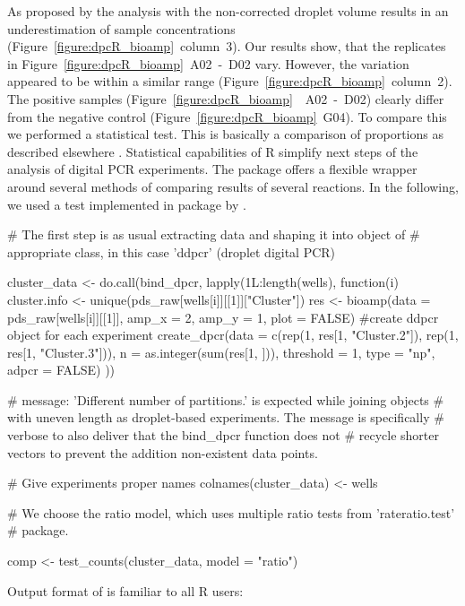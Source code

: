 As proposed by \citet{corbisier_2015} the analysis with the non-corrected 
droplet volume results in an underestimation of sample concentrations 
(Figure~\ref{figure:dpcR_bioamp}~column~3). Our results show, that the 
replicates in Figure~\ref{figure:dpcR_bioamp}~A02~-~D02 vary. However, the 
variation appeared to be within a similar range 
(Figure~\ref{figure:dpcR_bioamp}~column~2). The positive samples 
(Figure~\ref{figure:dpcR_bioamp}~~A02~-~D02) clearly differ from the negative 
control (Figure~\ref{figure:dpcR_bioamp}~G04). To compare this we performed a 
statistical test. This is basically a comparison of proportions as described 
elsewhere \citep{wang_2013}. Statistical capabilities of R simplify next steps 
of the analysis of digital PCR experiments. The  package offers a 
flexible wrapper  around several methods of comparing results 
of several reactions. In the following, we used a test implemented in 
 package by \citet{Fay_2010}.

\begin{example}
# The first step is as usual extracting data and shaping it into object of 
# appropriate class, in this case 'ddpcr' (droplet digital PCR)

cluster_data <- do.call(bind_dpcr, lapply(1L:length(wells), function(i) {
cluster.info <- unique(pds_raw[wells[i]][[1]]["Cluster"])
res <- bioamp(data = pds_raw[wells[i]][[1]], amp_x = 2, amp_y = 1, plot = FALSE)
#create ddpcr object for each experiment
create_dpcr(data = c(rep(1, res[1, "Cluster.2"]), rep(1, res[1, "Cluster.3"])), 
	    n = as.integer(sum(res[1, ])), threshold = 1, 
	    type = "np", adpcr = FALSE)
}))

# message: 'Different number of partitions.' is expected while joining objects
# with uneven length as droplet-based experiments. The message is specifically
# verbose to also deliver that the bind_dpcr function does not
# recycle shorter vectors to prevent the addition non-existent data points.

# Give experiments proper names
colnames(cluster_data) <- wells

# We choose the ratio model, which uses multiple ratio tests from 'rateratio.test'
# package.

comp <- test_counts(cluster_data, model = "ratio")
\end{example}

Output format of  is familiar to all R users:

